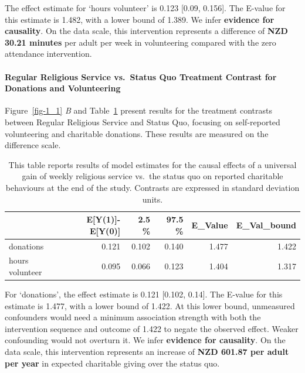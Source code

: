 \documentclass[
  single column]{article}
\let\oldparagraph\paragraph
\renewcommand{\paragraph}[1]{\oldparagraph{#1}\mbox{}}
\begin{document}
The effect estimate for `hours volunteer' is 0.123 {[}0.09, 0.156{]}.
The E-value for this estimate is 1.482, with a lower bound of 1.389. We
infer \textbf{evidence for causality}. On the data scale, this
intervention represents a difference of \textbf{NZD 30.21 minutes} per
adult per week in volunteering compared with the zero attendance
intervention.

\paragraph{Regular Religious Service vs.~Status Quo Treatment Contrast
for Donations and
Volunteering}\label{regular-religious-service-vs.-status-quo-treatment-contrast-for-donations-and-volunteering}

Figure~\ref{fig-1_1} \emph{B} and Table~\ref{tbl-1_2} present results
for the treatment contrasts between Regular Religious Service and Status
Quo, focusing on self-reported volunteering and charitable donations.
These results are measured on the difference scale.

\begin{longtable}[]{@{}lrrrrr@{}}

\caption{\label{tbl-1_2}This table reports results of model estimates
for the causal effects of a universal gain of weekly religious service
vs.~the status quo on reported charitable behaviours at the end of the
study. Contrasts are expressed in standard deviation units.}

\tabularnewline

\toprule\noalign{}
& E{[}Y(1){]}-E{[}Y(0){]} & 2.5 \% & 97.5 \% & E\_Value &
E\_Val\_bound \\
\midrule\noalign{}
\endhead
\bottomrule\noalign{}
\endlastfoot
donations & 0.121 & 0.102 & 0.140 & 1.477 & 1.422 \\
hours volunteer & 0.095 & 0.066 & 0.123 & 1.404 & 1.317 \\

\end{longtable}

For `donations', the effect estimate is 0.121 {[}0.102, 0.14{]}. The
E-value for this estimate is 1.477, with a lower bound of 1.422. At this
lower bound, unmeasured confounders would need a minimum association
strength with both the intervention sequence and outcome of 1.422 to
negate the observed effect. Weaker confounding would not overturn it. We
infer \textbf{evidence for causality}. On the data scale, this
intervention represents an increase of \textbf{NZD 601.87 per adult per
year} in expected charitable giving over the status quo.
\end{document}
